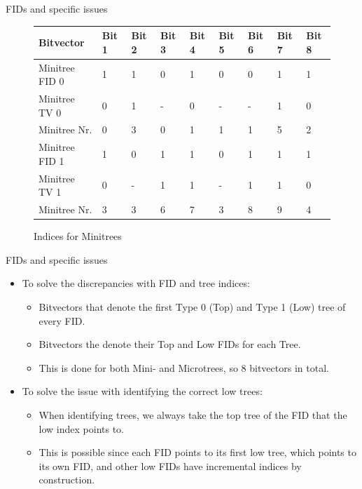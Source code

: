 \documentclass{beamer}
\begin{document}
\begin{frame}{FIDs and specific issues}
	\begin{figure}[h]
	\begin{tabular}{ |p{2.4cm}||p{0.6cm}|p{0.6cm}|p{0.6cm}|p{0.6cm}|p{0.6cm}|p{0.6cm}|p{0.6cm}|p{0.6cm}|  }
		 \hline
		 Bitvector & Bit 1 &Bit 2&Bit 3&Bit 4& Bit 5 &Bit 6&Bit 7&Bit 8\\
		 \hline
		 Minitree FID 0 & 1 & 1& 0 & 1 & 0 & 0 & 1 & 1\\
		 Minitree TV 0& 0 & 1 & - & 0 & - & - & 1 & 0\\
		 Minitree Nr. & 0 & 3 &  0 & 1 & 1 & 1 & 5 & 2\\
		 \hline
		 Minitree FID 1 & 1 & 0& 1 & 1 & 0 & 1 & 1 & 1\\
		 Minitree TV 1& 0 & - & 1 & 1 & - & 1 & 1 & 0\\
		 Minitree Nr. & 3 & 3 &  6 & 7 & 3 & 8 & 9 & 4\\
		 \hline
	\end{tabular}
	\caption{Indices for Minitrees}
	\end{figure}
\end{frame}
\begin{frame}{FIDs and specific issues}
	\begin{itemize}
		\item
		To solve the discrepancies with FID and tree indices:
		\begin{itemize}
			\item
				Bitvectors that denote the first Type 0 (Top) and Type 1 (Low) tree of every FID.
			\item
				Bitvectors the denote their Top and Low FIDs for each Tree.
			\item
				This is done for both Mini- and Microtrees, so 8 bitvectors in total.
		\end{itemize}
		\item
			To solve the issue with identifying the correct low trees:
		\begin{itemize}
			\item
				When identifying trees, we always take the top tree of the FID that the low index points to. 
			\item
				This is possible since each FID points to its first low tree, which points to its own FID, and other low FIDs have incremental indices by construction.
		\end{itemize}
	\end{itemize}
\end{frame}
\end{document}

